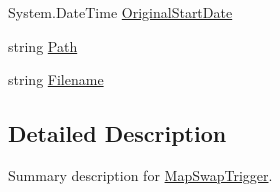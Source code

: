 \begin{DoxyCompactItemize}
\item 
System.\-Date\-Time \hyperlink{class_p_a_z___dispersal_1_1_map_swap_trigger_a6930eb92ca9f8bf9307c133ad760ba81}{Original\-Start\-Date}
\item 
string \hyperlink{class_p_a_z___dispersal_1_1_map_swap_trigger_a62702a24035e212484b104b65b66c7c8}{Path}
\item 
string \hyperlink{class_p_a_z___dispersal_1_1_map_swap_trigger_a13f3474fb3edb0c9ea1967441ee3df82}{Filename}
\end{DoxyCompactItemize}


\subsection{Detailed Description}
Summary description for \hyperlink{class_p_a_z___dispersal_1_1_map_swap_trigger}{Map\-Swap\-Trigger}. 



